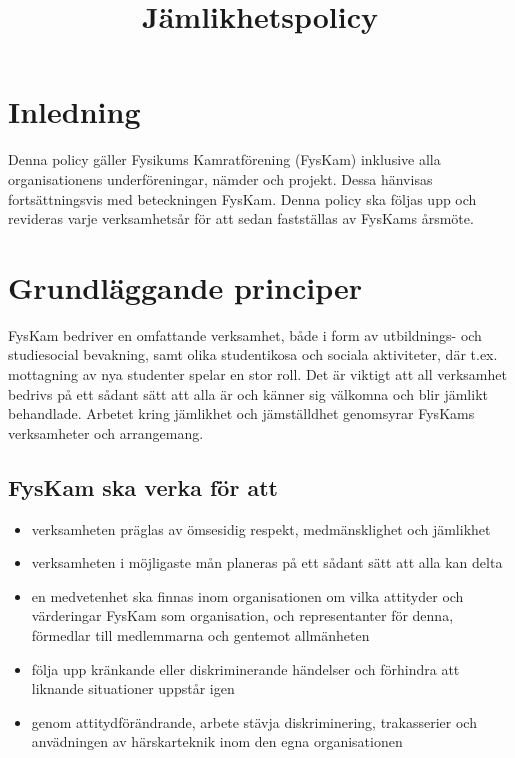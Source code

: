 \documentclass{dgovdoc}
\title{Jämlikhetspolicy}
\begin{document}
\maketitle

\section{Inledning}

Denna policy gäller Fysikums Kamratförening (FysKam) inklusive alla
organisationens underföreningar, nämder och projekt. Dessa hänvisas fortsättningsvis
med beteckningen FysKam. Denna policy ska följas upp och revideras
varje verksamhetsår för att sedan fastställas av FysKams årsmöte.

\section{Grundläggande principer}

FysKam bedriver en omfattande verksamhet, både i form av
utbildnings- och studiesocial bevakning, samt olika studentikosa och sociala aktiviteter,
där t.ex. mottagning av nya studenter spelar en stor roll. Det är viktigt att all
verksamhet bedrivs på ett sådant sätt att alla är och känner sig välkomna och blir
jämlikt behandlade. Arbetet kring jämlikhet och jämställdhet genomsyrar FysKams
verksamheter och arrangemang.

\subsection{FysKam ska verka för att}

\begin{itemize}
\item verksamheten präglas av ömsesidig respekt, medmänsklighet och jämlikhet
\item verksamheten i möjligaste mån planeras på ett sådant sätt att alla kan delta
\item en medvetenhet ska finnas inom organisationen om vilka attityder och
värderingar FysKam som organisation, och representanter för denna, förmedlar till
medlemmarna och gentemot allmänheten
\item följa upp kränkande eller diskriminerande händelser och förhindra att liknande
situationer uppstår igen
\item genom attitydförändrande, arbete stävja diskriminering, trakasserier och
anvädningen av härskarteknik inom den egna organisationen
\end{itemize}
\end{document}
